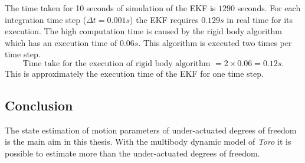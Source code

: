 The time taken for 10 seconds of simulation of the EKF is $1290$ seconds. For each integration time step ($\Delta t = 0.001 s$) the EKF requires $0.129 s$ in real time for its execution. The high computation time is caused by the rigid body algorithm which has an execution time of $0.06s$. This algorithm is executed two times per time step.
$$ \text{Time take for the execution of rigid body algorithm } = 2 \times 0.06 = 0.12 s.$$ This is approximately the execution time of the EKF for one time step.

\subsection{Conclusion}
The state estimation of motion parameters of under-actuated degrees of freedom is the main aim in this thesis. With the multibody dynamic model of \emph{Toro} it is possible to estimate more than the under-actuated degrees of freedom. 

